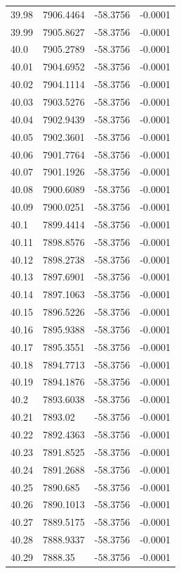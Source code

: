 \begin{table}[H]
\begin{tabular}{llll}
39.98 & 7906.4464 & -58.3756 & -0.0001 \\
39.99 & 7905.8627 & -58.3756 & -0.0001 \\
40.0 & 7905.2789 & -58.3756 & -0.0001 \\
40.01 & 7904.6952 & -58.3756 & -0.0001 \\
40.02 & 7904.1114 & -58.3756 & -0.0001 \\
40.03 & 7903.5276 & -58.3756 & -0.0001 \\
40.04 & 7902.9439 & -58.3756 & -0.0001 \\
40.05 & 7902.3601 & -58.3756 & -0.0001 \\
40.06 & 7901.7764 & -58.3756 & -0.0001 \\
40.07 & 7901.1926 & -58.3756 & -0.0001 \\
40.08 & 7900.6089 & -58.3756 & -0.0001 \\
40.09 & 7900.0251 & -58.3756 & -0.0001 \\
40.1 & 7899.4414 & -58.3756 & -0.0001 \\
40.11 & 7898.8576 & -58.3756 & -0.0001 \\
40.12 & 7898.2738 & -58.3756 & -0.0001 \\
40.13 & 7897.6901 & -58.3756 & -0.0001 \\
40.14 & 7897.1063 & -58.3756 & -0.0001 \\
40.15 & 7896.5226 & -58.3756 & -0.0001 \\
40.16 & 7895.9388 & -58.3756 & -0.0001 \\
40.17 & 7895.3551 & -58.3756 & -0.0001 \\
40.18 & 7894.7713 & -58.3756 & -0.0001 \\
40.19 & 7894.1876 & -58.3756 & -0.0001 \\
40.2 & 7893.6038 & -58.3756 & -0.0001 \\
40.21 & 7893.02 & -58.3756 & -0.0001 \\
40.22 & 7892.4363 & -58.3756 & -0.0001 \\
40.23 & 7891.8525 & -58.3756 & -0.0001 \\
40.24 & 7891.2688 & -58.3756 & -0.0001 \\
40.25 & 7890.685 & -58.3756 & -0.0001 \\
40.26 & 7890.1013 & -58.3756 & -0.0001 \\
40.27 & 7889.5175 & -58.3756 & -0.0001 \\
40.28 & 7888.9337 & -58.3756 & -0.0001 \\
40.29 & 7888.35 & -58.3756 & -0.0001 \\

\end{tabular}
\end{table}

